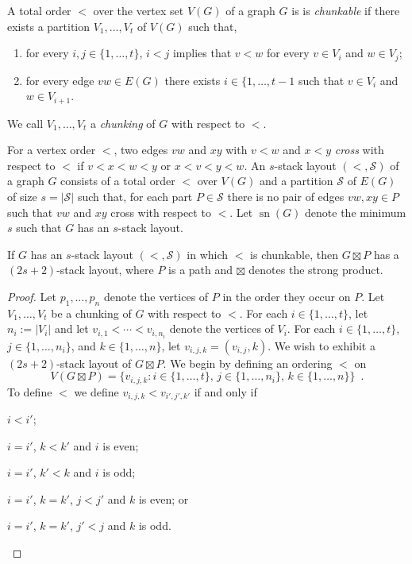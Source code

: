 \documentclass[kpfonts]{patmorin}
\DeclareMathOperator{\sn}{sn}
\renewcommand{\SS}{\mathcal{S}}
\begin{document}
A total order $<$ over the vertex set $V(G)$ of a graph $G$ is is \emph{chunkable} if there exists a partition $V_1,\ldots,V_t$ of $V(G)$ such that, 
\begin{enumerate}
  \item for every $i,j\in\{1,\ldots,t\}$,  $i< j$ implies that $v<w$ for every $v\in V_i$ and $w\in V_j$;
  \item for every edge $vw\in E(G)$ there exists $i\in\{1,\ldots,{t-1}$ such that $v\in V_i$ and $w\in V_{i+1}$.
\end{enumerate}
We call $V_1,\ldots,V_t$ a \emph{chunking} of $G$ with respect to $<$.

For a vertex order $<$, two edges $vw$ and $xy$ with $v<w$ and $x<y$ \emph{cross} with respect to $<$ if $v<x<w<y$ or $x<v<y<w$.  An $s$-stack layout $(<,\SS)$ of a graph $G$ consists of a total order $<$ over $V(G)$ and a partition $\SS$ of $E(G)$ of size $s=|\SS|$ such that, for each part $P\in \SS$ there is no pair of edges $vw,xy\in P$ such that $vw$ and $xy$ cross with respect to $<$.  Let $\sn(G)$ denote the minimum $s$ such that $G$ has an $s$-stack layout.

\begin{thm}
  If $G$ has an $s$-stack layout $(<,\SS)$ in which $<$ is chunkable, then $G\boxtimes P$ has a $(2s+2)$-stack layout, where $P$ is a path and $\boxtimes$ denotes the strong product.
\end{thm}

\begin{proof}
  Let $p_1,\ldots,p_n$ denote the vertices of $P$ in the order they occur on $P$.  Let $V_1,\ldots,V_t$ be a chunking of $G$ with respect to $<$.  For each $i\in\{1,\ldots,t\}$, let $n_i:=|V_i|$ and let $v_{i,1}<\cdots<v_{i,n_i}$ denote the vertices of $V_i$. For each $i\in\{1,\ldots,t\}$, $j\in\{1,\ldots,n_i\}$, and $k\in\{1,\ldots,n\}$, let $v_{i,j,k}=(v_{i,j},k)$.  We wish to exhibit a $(2s+2)$-stack layout of $G\boxtimes P$.  We begin by defining an ordering $<$ on 
  \[
    V(G\boxtimes P) = \{v_{i,j,k} : i\in\{1,\ldots,t\},\, j\in\{1,\ldots,n_i\},\, k\in\{1,\ldots,n\} \} \enspace .
  \]
  To define $<$ we define $v_{i,j,k}<v_{i',j',k'}$ if and only if
  \begin{compactenum}
    \item $i < i'$;
    \item $i = i'$, $k<k'$ and $i$ is even; 
    \item $i = i'$, $k'<k$ and $i$ is odd;
    \item $i = i'$, $k=k'$, $j < j'$ and $k$ is even; or
    \item $i = i'$, $k=k'$, $j' < j$ and $k$ is odd.
  \end{compactenum}
  
\end{proof}
\end{document}
